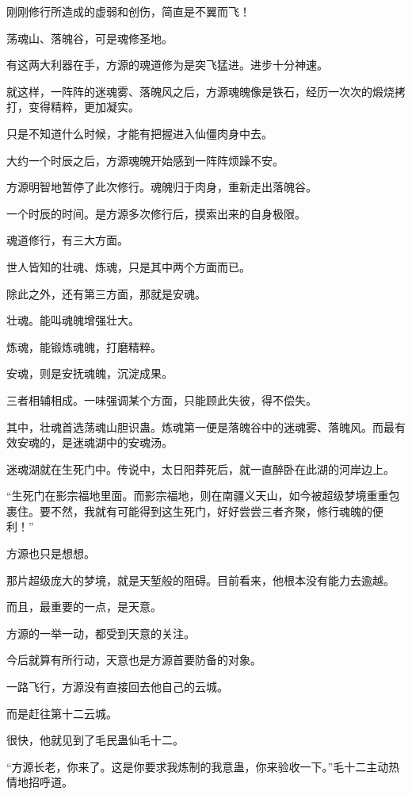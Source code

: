 \begin{this_body}
刚刚修行所造成的虚弱和创伤，简直是不翼而飞！

荡魂山、落魄谷，可是魂修圣地。

有这两大利器在手，方源的魂道修为是突飞猛进。进步十分神速。

就这样，一阵阵的迷魂雾、落魄风之后，方源魂魄像是铁石，经历一次次的煅烧拷打，变得精粹，更加凝实。

只是不知道什么时候，才能有把握进入仙僵肉身中去。

大约一个时辰之后，方源魂魄开始感到一阵阵烦躁不安。

方源明智地暂停了此次修行。魂魄归于肉身，重新走出落魄谷。

一个时辰的时间。是方源多次修行后，摸索出来的自身极限。

魂道修行，有三大方面。

世人皆知的壮魂、炼魂，只是其中两个方面而已。

除此之外，还有第三方面，那就是安魂。

壮魂。能叫魂魄增强壮大。

炼魂，能锻炼魂魄，打磨精粹。

安魂，则是安抚魂魄，沉淀成果。

三者相辅相成。一味强调某个方面，只能顾此失彼，得不偿失。

其中，壮魂首选荡魂山胆识蛊。炼魂第一便是落魄谷中的迷魂雾、落魄风。而最有效安魂的，是迷魂湖中的安魂汤。

迷魂湖就在生死门中。传说中，太日阳莽死后，就一直醉卧在此湖的河岸边上。

“生死门在影宗福地里面。而影宗福地，则在南疆义天山，如今被超级梦境重重包裹住。要不然，我就有可能得到这生死门，好好尝尝三者齐聚，修行魂魄的便利！”

方源也只是想想。

那片超级庞大的梦境，就是天堑般的阻碍。目前看来，他根本没有能力去逾越。

而且，最重要的一点，是天意。

方源的一举一动，都受到天意的关注。

今后就算有所行动，天意也是方源首要防备的对象。

一路飞行，方源没有直接回去他自己的云城。

而是赶往第十二云城。

很快，他就见到了毛民蛊仙毛十二。

“方源长老，你来了。这是你要求我炼制的我意蛊，你来验收一下。”毛十二主动热情地招呼道。


\end{this_body}
